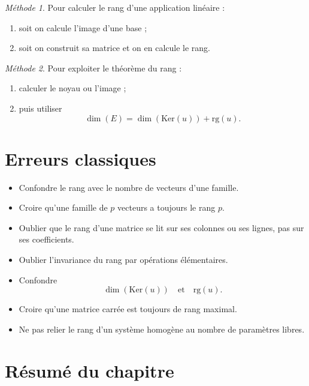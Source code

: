 \documentclass[11pt,a4paper]{article}
\theoremstyle{remark}
\newtheorem*{methode}{Méthode}
\newcommand{\Ker}{\mathrm{Ker}}
\newcommand{\rg}{\mathrm{rg}}
\begin{document}
\begin{methode}
Pour calculer le rang d’une application linéaire :
\begin{enumerate}
    \item soit on calcule l’image d’une base ;
    \item soit on construit sa matrice et on en calcule le rang.
\end{enumerate}
\end{methode}

\begin{methode}
Pour exploiter le théorème du rang :
\begin{enumerate}
    \item calculer le noyau ou l’image ;
    \item puis utiliser
    \[
    \dim(E)=\dim(\Ker(u))+\rg(u).
    \]
\end{enumerate}
\end{methode}

\section{Erreurs classiques}

\begin{itemize}
    \item Confondre le rang avec le nombre de vecteurs d’une famille.
    \item Croire qu’une famille de \(p\) vecteurs a toujours le rang \(p\).
    \item Oublier que le rang d’une matrice se lit sur ses colonnes ou ses lignes, pas sur ses coefficients.
    \item Oublier l’invariance du rang par opérations élémentaires.
    \item Confondre
    \[
    \dim(\Ker(u))
    \quad \text{et} \quad
    \rg(u).
    \]
    \item Croire qu’une matrice carrée est toujours de rang maximal.
    \item Ne pas relier le rang d’un système homogène au nombre de paramètres libres.
\end{itemize}

\section{Résumé du chapitre}
\end{document}
